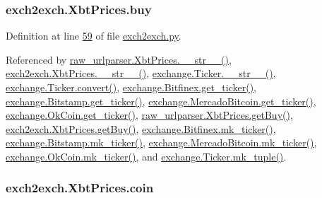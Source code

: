 \subsubsection[{\texorpdfstring{buy}{buy}}]{\setlength{\rightskip}{0pt plus 5cm}exch2exch.\+Xbt\+Prices.\+buy}\hypertarget{classexch2exch_1_1_xbt_prices_a8f1d8ac0ef114ea3645314578697b7ac}{}\label{classexch2exch_1_1_xbt_prices_a8f1d8ac0ef114ea3645314578697b7ac}


Definition at line \hyperlink{exch2exch_8py_source_l00059}{59} of file \hyperlink{exch2exch_8py_source}{exch2exch.\+py}.



Referenced by \hyperlink{raw__urlparser_8py_source_l00074}{raw\+\_\+urlparser.\+Xbt\+Prices.\+\_\+\+\_\+str\+\_\+\+\_\+()}, \hyperlink{exch2exch_8py_source_l00091}{exch2exch.\+Xbt\+Prices.\+\_\+\+\_\+str\+\_\+\+\_\+()}, \hyperlink{exchange_8py_source_l00111}{exchange.\+Ticker.\+\_\+\+\_\+str\+\_\+\+\_\+()}, \hyperlink{exchange_8py_source_l00065}{exchange.\+Ticker.\+convert()}, \hyperlink{exchange_8py_source_l00340}{exchange.\+Bitfinex.\+get\+\_\+ticker()}, \hyperlink{exchange_8py_source_l00409}{exchange.\+Bitstamp.\+get\+\_\+ticker()}, \hyperlink{exchange_8py_source_l00543}{exchange.\+Mercado\+Bitcoin.\+get\+\_\+ticker()}, \hyperlink{exchange_8py_source_l00608}{exchange.\+Ok\+Coin.\+get\+\_\+ticker()}, \hyperlink{raw__urlparser_8py_source_l00062}{raw\+\_\+urlparser.\+Xbt\+Prices.\+get\+Buy()}, \hyperlink{exch2exch_8py_source_l00070}{exch2exch.\+Xbt\+Prices.\+get\+Buy()}, \hyperlink{exchange_8py_source_l00354}{exchange.\+Bitfinex.\+mk\+\_\+ticker()}, \hyperlink{exchange_8py_source_l00423}{exchange.\+Bitstamp.\+mk\+\_\+ticker()}, \hyperlink{exchange_8py_source_l00557}{exchange.\+Mercado\+Bitcoin.\+mk\+\_\+ticker()}, \hyperlink{exchange_8py_source_l00622}{exchange.\+Ok\+Coin.\+mk\+\_\+ticker()}, and \hyperlink{exchange_8py_source_l00096}{exchange.\+Ticker.\+mk\+\_\+tuple()}.

\subsubsection[{\texorpdfstring{coin}{coin}}]{\setlength{\rightskip}{0pt plus 5cm}exch2exch.\+Xbt\+Prices.\+coin}\hypertarget{classexch2exch_1_1_xbt_prices_a1191c8825e8f1333b4100b89fa2be053}{}\label{classexch2exch_1_1_xbt_prices_a1191c8825e8f1333b4100b89fa2be053}


